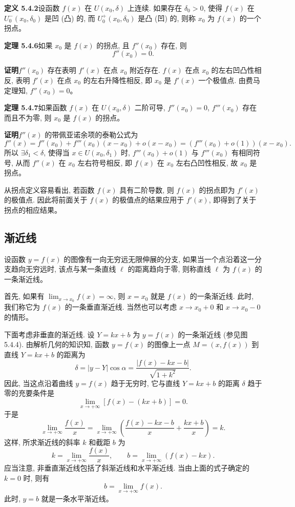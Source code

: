\documentclass[UTF8, 12pt, fontset=fandol, oneside]{ctexart}
\begin{document}
\noindent\textbf{定义 5.4.2}\quad 设函数 $f(x)$ 在 $U(x_0,\delta)$ 上连续. 如果存在 $\delta_0>0$, 使得 $f(x)$ 在 $U_0^-(x_0,\delta_0)$ 是凹 (凸) 的, 而 $U_0^+(x_0,\delta_0)$ 是凸 (凹) 的, 则称 $x_0$ 为 $f(x)$ 的一个拐点。

\noindent\textbf{定理 5.4.6}\quad 如果 $x_0$ 是 $f(x)$ 的拐点, 且 $f''(x_0)$ 存在, 则
\[
  f''(x_0)=0.
\]

\noindent\textbf{证明}\quad $f''(x_0)$ 存在表明 $f'(x)$ 在点 $x_0$ 附近存在. $f(x)$ 在点 $x_0$ 的左右凹凸性相反, 表明 $f'(x)$ 在点 $x_0$ 的左右升降性相反, 即 $x_0$ 是 $f'(x)$ 一个极值点. 由费马定理知, $f''(x_0)=0$。

\noindent\textbf{定理 5.4.7}\quad 如果函数 $f(x)$ 在 $U(x_0,\delta)$ 二阶可导, $f''(x_0)=0$, $f'''(x_0)$ 存在而且不为零, 则 $x_0$ 是 $f(x)$ 的拐点。

\noindent\textbf{证明}\quad $f''(x)$ 的带佩亚诺余项的泰勒公式为
\[
  f''(x)=f''(x_0)+f'''(x_0)(x-x_0)+o(x-x_0)
  =(f'''(x_0)+o(1))(x-x_0).
\]
所以 $\exists\delta_1<\delta$, 使得当 $x\in U(x_0,\delta_1)$ 时, $f'''(x_0)+o(1)$ 与 $f'''(x_0)$ 有相同符号, 从而 $f''(x)$ 在 $x_0$ 左右符号相反, 即 $f(x)$ 在 $x_0$ 左右凸凹性相反, 故 $x_0$ 是拐点。

从拐点定义容易看出, 若函数 $f(x)$ 具有二阶导数, 则 $f(x)$ 的拐点即为 $f'(x)$ 的极值点. 因此将前面关于 $f(x)$ 的极值点的结果应用于 $f'(x)$, 即得到了关于拐点的相应结果。

\subsection{渐近线}

设函数 $y=f(x)$ 的图像有一向无穷远无限伸展的分支, 如果当一个点沿着这一分支趋向无穷远时, 该点与某一条直线 $\ell$ 的距离趋向于零, 则称直线 $\ell$ 为 $f(x)$ 的一条渐近线。

首先, 如果有 $\lim_{x\to x_0}f(x)=\infty$, 则 $x=x_0$ 就是 $f(x)$ 的一条渐近线. 此时, 我们称它为 $f(x)$ 的一条垂直渐近线. 当然也可以考虑 $x\to x_0+0$ 和 $x\to x_0-0$ 的情形。

下面考虑非垂直的渐近线. 设 $Y=kx+b$ 为 $y=f(x)$ 的一条渐近线 (参见图 5.4.4). 由解析几何的知识知, 函数 $y=f(x)$ 的图像上一点 $M=(x,f(x))$ 到直线 $Y=kx+b$ 的距离为
\[
  \delta=|y-Y|\cos\alpha=\frac{|f(x)-kx-b|}{\sqrt{1+k^2}}.
\]
因此, 当这点沿着曲线 $y=f(x)$ 趋于无穷时, 它与直线 $Y=kx+b$ 的距离 $\delta$ 趋于零的充要条件是
\[
  \lim_{x\to+\infty}[f(x)-(kx+b)]=0.
\]
于是
\[
  \lim_{x\to+\infty}\frac{f(x)}x
  =\lim_{x\to+\infty}\left(\frac{f(x)-kx-b}{x}+\frac{kx+b}{x}\right)=k.
\]
这样, 所求渐近线的斜率 $k$ 和截距 $b$ 为
\[
  k=\lim_{x\to+\infty}\frac{f(x)}x,\qquad
  b=\lim_{x\to+\infty}(f(x)-kx).
\]
应当注意, 非垂直渐近线包括了斜渐近线和水平渐近线. 当由上面的式子确定的 $k=0$ 时, 则有
\[
  b=\lim_{x\to+\infty}f(x).
\]
此时, $y=b$ 就是一条水平渐近线。
\end{document}
